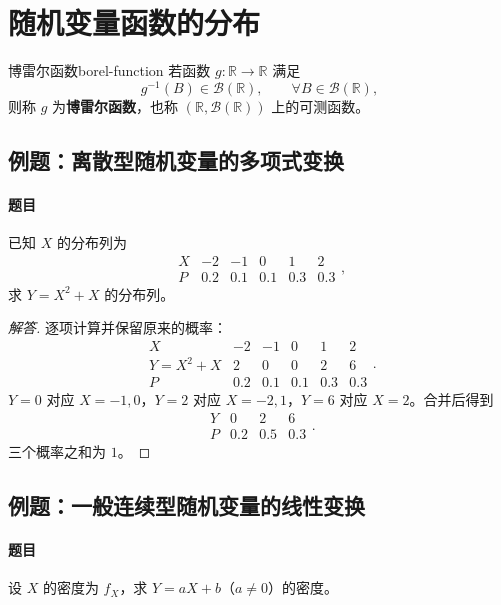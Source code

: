 \clearpage\section{随机变量函数的分布}\label{k:transform}

\begin{mydefinition}{博雷尔函数}{borel-function}
若函数 $g:\mathbb R\to\mathbb R$ 满足
\[
g^{-1}(B)\in\mathcal B(\mathbb R),
\qquad \forall B\in\mathcal B(\mathbb R),
\]
则称 $g$ 为\textbf{博雷尔函数}，也称 $(\mathbb R,\mathcal B(\mathbb R))$ 上的可测函数。
\end{mydefinition}

\subsection{例题：离散型随机变量的多项式变换}\label{note:c2:e20}
\paragraph{题目}
已知 $X$ 的分布列为
\[
\begin{array}{c|ccccc}
X&-2&-1&0&1&2\\ \hline
P&0.2&0.1&0.1&0.3&0.3
\end{array},
\]
求 $Y=X^2+X$ 的分布列。

\begin{proof}[解答]
逐项计算并保留原来的概率：
\[
\begin{array}{c|ccccc}
X&-2&-1&0&1&2\\ \hline
Y=X^2+X&2&0&0&2&6\\
P&0.2&0.1&0.1&0.3&0.3
\end{array}.
\]
$Y=0$ 对应 $X=-1,0$，$Y=2$ 对应 $X=-2,1$，$Y=6$ 对应 $X=2$。合并后得到
\[
\begin{array}{c|ccc}
Y&0&2&6\\ \hline
P&0.2&0.5&0.3
\end{array}.
\]
三个概率之和为 $1$。
\end{proof}

\subsection{例题：一般连续型随机变量的线性变换}\label{note:c2:e21}
\paragraph{题目}
设 $X$ 的密度为 $f_X$，求 $Y=aX+b$（$a\ne0$）的密度。

